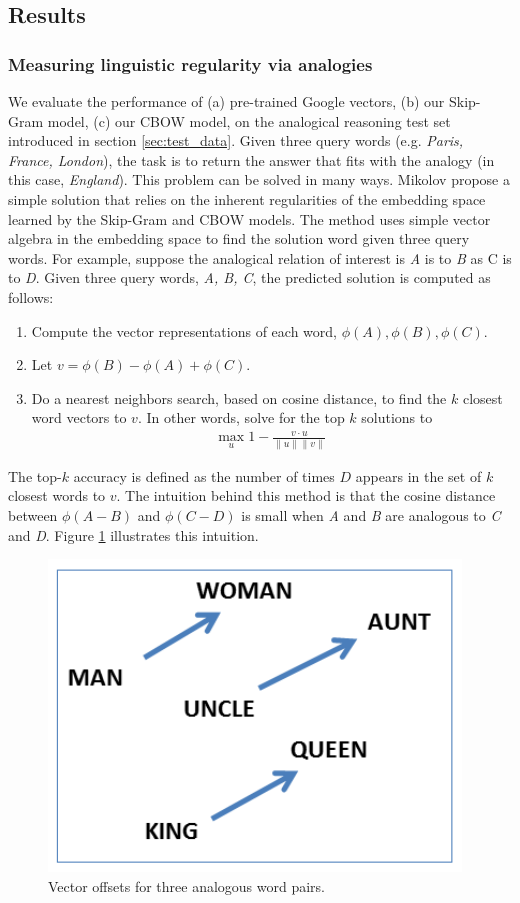 \subsection{Results}

\subsubsection{Measuring linguistic regularity via analogies}
We evaluate the performance of (a) pre-trained Google vectors, (b) our Skip-Gram model, (c) our CBOW model, on the analogical reasoning test set introduced in section \ref{sec:test_data}. Given three query words (e.g. {\it Paris, France, London}), the task is to return the answer that fits with the analogy (in this case, {\it England}). This problem can be solved in many ways. Mikolov \etal \cite{mikolov1} propose a simple solution that relies on the inherent regularities of the embedding space learned by the Skip-Gram and CBOW models. The method uses simple vector algebra in the embedding space to find the solution word given three query words. For example, suppose the analogical relation of interest is {\it A} is to {\it B} as {\it} C is to {\it D}. Given three query words, {\it A, B, C}, the predicted solution is computed as follows:
\begin{enumerate}
\item Compute the vector representations of each word, $\phi(A), \phi(B), \phi(C)$.
\item Let $v = \phi(B) - \phi(A) + \phi(C)$.
\item Do a nearest neighbors search, based on cosine distance, to find the $k$ closest word vectors to $v$. In other words, solve for the top $k$ solutions to 
	\begin{align} \max_u 1 - \frac{ v \cdot u}{\| u \| \| v \|}\ \end{align}
\end{enumerate}

The top-$k$ accuracy is defined as the number of times $D$ appears in the set of $k$ closest words to $v$. The intuition behind this method is that the cosine distance between $\phi(A - B)$ and $\phi(C - D)$ is small when {\it A} and {\it B} are analogous to {\it C} and {\it D}. Figure \ref{fig:offsets} illustrates this intuition. 

\begin{figure}[h]
\centering
\includegraphics[width=.45\textwidth]{./images/king_queen.png}
\caption{Vector offsets for three analogous word pairs.}
\label{fig:offsets}
\end{figure}

